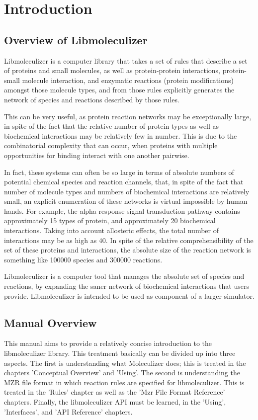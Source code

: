 \chapter{Introduction}

\section{Overview of Libmoleculizer}
Libmoleculizer is a computer library that takes a set of rules that 
describe a set of proteins and small molecules, as well as
protein-protein interactions, protein-small molecule interaction, and
enzymatic reactions (protein modifications) amongst those molecule
types, and from those rules explicitly generates the network of
species and reactions described by those rules. 

This can be very useful, as protein reaction networks may be
exceptionally large, in spite of the fact that the relative number of
protein types as well as biochemical interactions may be relatively
few in number.  This is due to the combinatorial complexity that can
occur, when proteins with multiple opportunities for binding interact
with one another pairwise.  

In fact, these systems can often be so large in terms of absolute
numbers of potential chemical species and reaction channels, that, in
spite of the fact that number of molecule types and numbers of
biochemical interactions are relatively small, an explicit enumeration
of these networks is virtual impossible by human hands.  For example,
the alpha response signal transduction pathway contains approximately
15 types of protein, and approximately 20 biochemical interactions.
Taking into account allosteric effects, the total number of
interactions may be as high as 40.  In spite of the relative
comprehensibility of the set of these proteins and interactions, the
absolute size of the reaction network is something like 100000 species
and 300000 reactions.  

Libmoleculizer is a computer tool that manages the absolute set of
species and reactions, by expanding the saner network of biochemical
interactions that users provide.  Libmoleculizer is intended to be
used as component of a larger simulator.

\section{Manual Overview}
This manual aims to provide a relatively concise introduction to the
libmoleculizer library.  This treatment basically can be divided up
into three aspects.  The first is understanding what Moleculizer does;
this is treated in the chapters 'Conceptual Overview' and 'Using'.
The second is understanding the MZR file format in which reaction
rules are specified for libmoleculizer.  This is treated in the
'Rules' chapter as well as the 'Mzr File Format Reference' chapters.
Finally, the libmoleculizer API must be learned, in the 'Using',
'Interfaces', and 'API Reference' chapters.  


